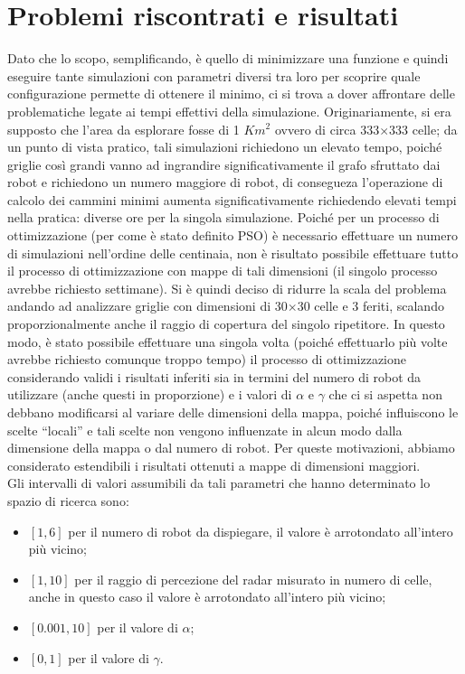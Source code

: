 \section{Problemi riscontrati e risultati}
\label{sec:psoResults}
Dato che lo scopo, semplificando, è quello di minimizzare una funzione e quindi eseguire tante simulazioni con parametri diversi tra loro per scoprire quale configurazione permette di ottenere il minimo, ci si trova a dover affrontare delle problematiche legate ai tempi effettivi della simulazione.
Originariamente, si era supposto che l'area da esplorare fosse di 1 $Km^2$ ovvero di circa 333$\times$333 celle; da un punto di vista pratico, tali simulazioni richiedono un elevato tempo, poiché griglie così grandi vanno ad ingrandire significativamente il grafo sfruttato dai robot e richiedono un numero maggiore di robot, di consegueza l'operazione di calcolo dei cammini minimi aumenta significativamente richiedendo elevati tempi nella pratica: diverse ore per la singola simulazione.
Poiché per un processo di ottimizzazione (per come è stato definito PSO) è necessario effettuare un numero di simulazioni nell'ordine delle centinaia, non è risultato possibile effettuare tutto il processo di ottimizzazione con mappe di tali dimensioni (il singolo processo avrebbe richiesto settimane).
Si è quindi deciso di ridurre la scala del problema andando ad analizzare griglie con dimensioni di 30$\times$30 celle e 3 feriti, scalando proporzionalmente anche il raggio di copertura del singolo ripetitore.
In questo modo, è stato possibile effettuare una singola volta (poiché effettuarlo più volte avrebbe richiesto comunque troppo tempo) il processo di ottimizzazione considerando validi i risultati inferiti sia in termini del numero di robot da utilizzare (anche questi in proporzione) e i valori di $\alpha$ e $\gamma$ che ci si aspetta non debbano modificarsi al variare delle dimensioni della mappa, poiché influiscono le scelte “locali” e tali scelte non vengono influenzate in alcun modo dalla dimensione della mappa o dal numero di robot.
Per queste motivazioni, abbiamo considerato estendibili i risultati ottenuti a mappe di dimensioni maggiori.\\
Gli intervalli di valori assumibili da tali parametri che hanno determinato lo spazio di ricerca sono:
\begin{itemize}
	\item $\left[1, 6\right]$ per il numero di robot da dispiegare, il valore è arrotondato all'intero più vicino;
	\item $\left[1, 10\right]$ per il raggio di percezione del radar misurato in numero di celle, anche in questo caso il valore è arrotondato all'intero più vicino;
	\item $\left[0.001, 10\right]$ per il valore di $\alpha$;
	\item $\left[0, 1\right]$ per il valore di $\gamma$.
\end{itemize}
